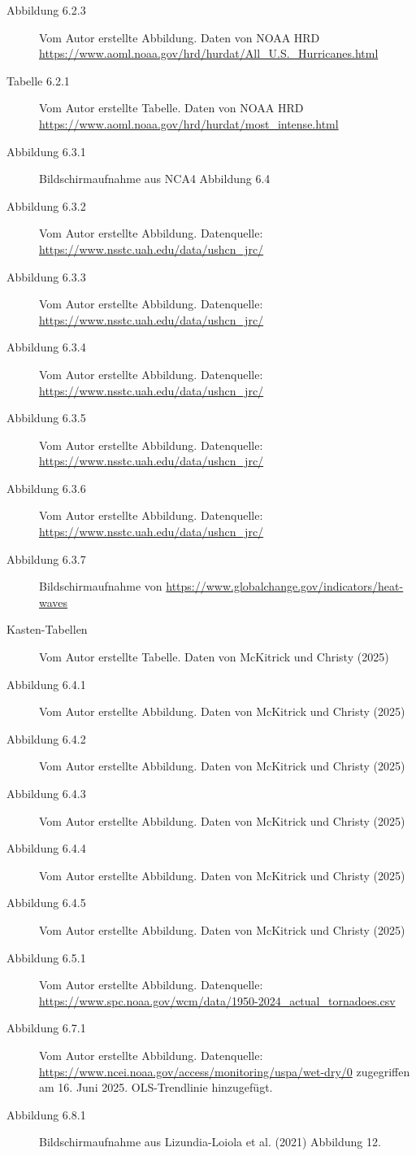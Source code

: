\documentclass[12pt,paper=a4,DIV=12,parskip=never,chapterprefix=false,headings=standardclasses]{scrreprt}
\begin{document}
\begin{description}
\item[Abbildung 6.2.3] Vom Autor erstellte Abbildung. Daten von NOAA HRD \url{https://www.aoml.noaa.gov/hrd/hurdat/All_U.S._Hurricanes.html}
\item[Tabelle 6.2.1] Vom Autor erstellte Tabelle. Daten von NOAA HRD \url{https://www.aoml.noaa.gov/hrd/hurdat/most_intense.html}
\item[Abbildung 6.3.1] Bildschirmaufnahme aus NCA4 Abbildung 6.4
\item[Abbildung 6.3.2] Vom Autor erstellte Abbildung. Datenquelle: \url{https://www.nsstc.uah.edu/data/ushcn_jrc/}
\item[Abbildung 6.3.3] Vom Autor erstellte Abbildung. Datenquelle: \url{https://www.nsstc.uah.edu/data/ushcn_jrc/}
\item[Abbildung 6.3.4] Vom Autor erstellte Abbildung. Datenquelle: \url{https://www.nsstc.uah.edu/data/ushcn_jrc/}
\item[Abbildung 6.3.5] Vom Autor erstellte Abbildung. Datenquelle: \url{https://www.nsstc.uah.edu/data/ushcn_jrc/}
\item[Abbildung 6.3.6] Vom Autor erstellte Abbildung. Datenquelle: \url{https://www.nsstc.uah.edu/data/ushcn_jrc/}
\item[Abbildung 6.3.7] Bildschirmaufnahme von \url{https://www.globalchange.gov/indicators/heat-waves}
\item[Kasten-Tabellen] Vom Autor erstellte Tabelle. Daten von McKitrick und Christy (2025)
\item[Abbildung 6.4.1] Vom Autor erstellte Abbildung. Daten von McKitrick und Christy (2025)
\item[Abbildung 6.4.2] Vom Autor erstellte Abbildung. Daten von McKitrick und Christy (2025)
\item[Abbildung 6.4.3] Vom Autor erstellte Abbildung. Daten von McKitrick und Christy (2025)
\item[Abbildung 6.4.4] Vom Autor erstellte Abbildung. Daten von McKitrick und Christy (2025)
\item[Abbildung 6.4.5] Vom Autor erstellte Abbildung. Daten von McKitrick und Christy (2025)
\item[Abbildung 6.5.1] Vom Autor erstellte Abbildung. Datenquelle: \url{https://www.spc.noaa.gov/wcm/data/1950-2024_actual_tornadoes.csv}
\item[Abbildung 6.7.1] Vom Autor erstellte Abbildung. Datenquelle: \url{https://www.ncei.noaa.gov/access/monitoring/uspa/wet-dry/0} zugegriffen am 16. Juni 2025. OLS-Trendlinie hinzugefügt.
\item[Abbildung 6.8.1] Bildschirmaufnahme aus Lizundia-Loiola et al. (2021) Abbildung 12.

\end{description}
\end{document}
